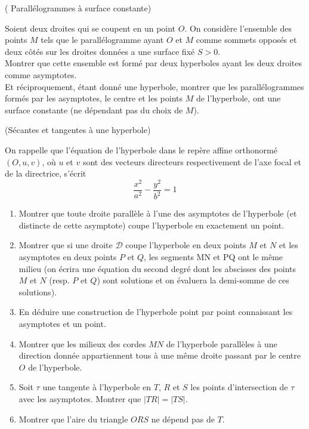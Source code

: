 \documentclass[a4paper,12pt,reqno]{amsart}
\begin{document}
\begin{exo} ( Parallélogrammes à surface constante)


  Soient deux droites qui se coupent en un point $O$. On considère l'ensemble des points $M$ tels que le parallélogramme ayant $O$ et $M$ comme sommets opposés et deux côtés sur les droites données a une surface fixé $S>0$.\\
  Montrer que cette ensemble est formé par deux hyperboles ayant les deux droites comme asymptotes. \\
  Et réciproquement, étant donné une hyperbole, montrer que les parallélogrammes formés par les asymptotes, le centre et les points $M$ de l'hyperbole, ont une surface constante (ne dépendant pas du choix de $M$).
\end{exo}

\begin{exo} (Sécantes et tangentes à une hyperbole)


On rappelle que l'équation de l'hyperbole dans le repère affine orthonormé $(O,u,v)$, où $u$ et $v$ sont des vecteurs directeurs respectivement de l'axe focal et de la directrice, s'écrit
$$
  \frac{x^{2}}{a^{2}}-\frac{y^{2}}{b^{2}}=1
$$

\begin{enumerate}
  \item Montrer que toute droite parallèle à l'une des asymptotes de l'hyperbole (et distincte de cette asymptote) coupe l'hyperbole en exactement un point.

  \item Montrer que si une droite $\mathcal{D}$ coupe l'hyperbole en deux points $M$ et $N$ et les asymptotes en deux points $P$ et $Q$, les segments MN et PQ ont le même milieu (on écrira une équation du second degré dont les abscisses des points $M$ et $N$ (resp. $P$ et $Q$) sont solutions et on évaluera la demi-somme de ces solutions).

  \item En déduire une construction de l'hyperbole point par point connaissant les asymptotes et un point.

  \item Montrer que les milieux des cordes $MN$ de l'hyperbole parallèles à une direction donnée appartiennent tous à une même droite passant par le centre $O$ de l'hyperbole.

  \item Soit $\tau$ une tangente à l'hyperbole en $T$, $R$ et $S$ les points d'intersection de $\tau$ avec les asymptotes. Montrer que $| TR | = | TS |$.

  \item Montrer que l'aire du triangle $ORS$ ne dépend pas de $T$.
\end{enumerate}

\end{exo}
\end{document}
